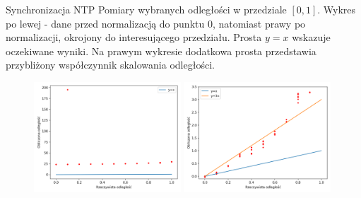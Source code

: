 \begin{frame}
    \begin{block}{Synchronizacja NTP}
        Pomiary wybranych odległości w przedziale $[0,1]$. Wykres po lewej - dane przed normalizacją do punktu $0$, natomiast prawy po normalizacji, okrojony do interesującego przedziału. Prosta $y=x$ wskazuje oczekiwane wyniki. Na prawym wykresie dodatkowa prosta przedstawia przybliżony współczynnik skalowania odległości.
    \end{block}
    \begin{figure}
        \centering
        \includegraphics[width=0.49\textwidth]{../pics/ntp_sync_dist/dists.png}
        \includegraphics[width=0.49\textwidth]{../pics/ntp_sync_dist/dists_close.png}
    \end{figure}
\end{frame}